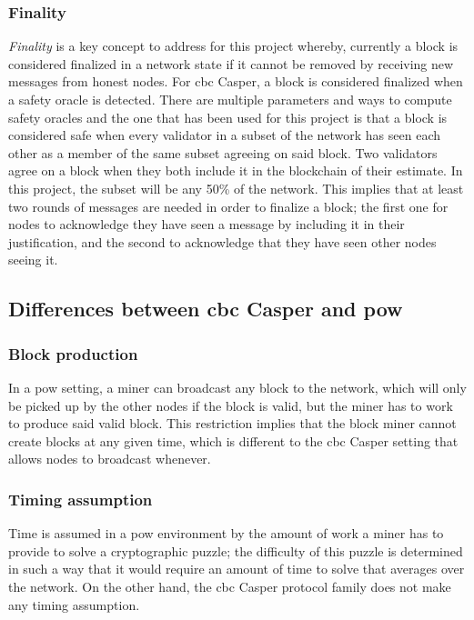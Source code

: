 \subsubsection{Finality}
\label{ssec:finality}
\textit{Finality} is a key concept to address for this project whereby,
currently a block is considered finalized in a network state if it cannot be
removed by receiving new messages from honest nodes.
For \gls{cbc} Casper, a block is considered finalized when a safety oracle is
detected. There are multiple parameters and ways to compute safety oracles and
the one that has been used for this project is that a block is considered safe
when every validator in a subset of the network has seen each other as a member of the
same subset agreeing on said block. Two validators agree on a block when they both
include it in the blockchain of their estimate. In this project, the subset will
be any 50\% of the network. This implies that at least two rounds of messages
are needed in order to finalize a block; the first one for nodes to acknowledge
they have seen a message by including it in their justification, and the second
to acknowledge that they have seen other nodes seeing it.


\FloatBarrier
\subsection{Differences between \gls{cbc} Casper and \gls{pow}}
\label{ssec:powVsPos}
\subsubsection{Block production}
In a \gls{pow}\cite{yellowpaper} setting, a miner can broadcast any block to the
network, which will only be picked up by the other nodes if the block is valid,
but the miner has to work to produce said valid block. This restriction implies
that the block miner cannot create blocks at any given time, which is different
to the \gls{cbc} Casper setting that allows nodes to broadcast whenever.

\subsubsection{Timing assumption}
Time is assumed in a \gls{pow} environment by the amount of work a miner has to
provide to solve a cryptographic puzzle; the difficulty of this puzzle is
determined in such a way that it would require an amount of time to solve that
averages over the network. On the other hand, the \gls{cbc} Casper protocol
family does not make any timing assumption.


